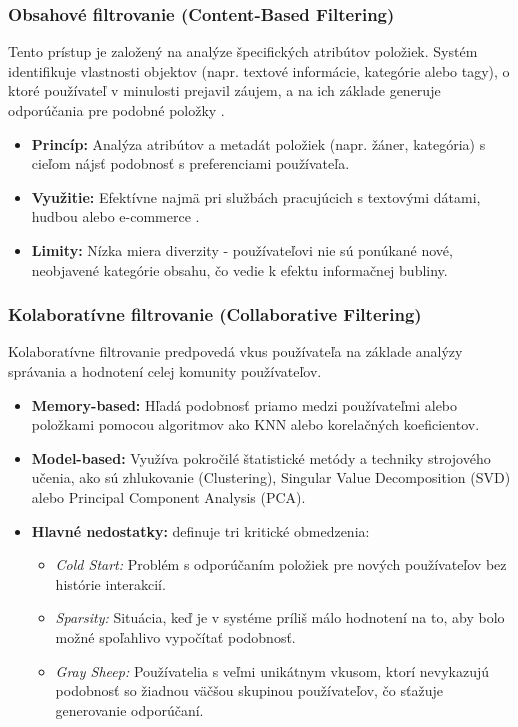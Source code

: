 \subsubsection{Obsahové filtrovanie (Content-Based Filtering)}
Tento prístup je založený na analýze špecifických atribútov položiek. Systém identifikuje vlastnosti objektov
(napr. textové informácie, kategórie alebo tagy), o ktoré používateľ v minulosti prejavil záujem, 
a na ich základe generuje odporúčania pre podobné položky \cite{ko2022survey}.
\begin{itemize}[noitemsep]
    \item \textbf{Princíp:} Analýza atribútov a metadát položiek (napr. žáner, kategória) s cieľom nájsť podobnosť s preferenciami používateľa.
    \item \textbf{Využitie:} Efektívne najmä pri službách pracujúcich s textovými dátami, hudbou alebo e-commerce .
    \item \textbf{Limity:} Nízka miera diverzity - používateľovi nie sú ponúkané nové, neobjavené kategórie obsahu, čo vedie k efektu informačnej bubliny.
\end{itemize}\cite{ko2022survey}

\subsubsection{Kolaboratívne filtrovanie (Collaborative Filtering)}
Kolaboratívne filtrovanie predpovedá vkus používateľa na základe analýzy správania a hodnotení 
celej komunity používateľov.

\begin{itemize}[noitemsep]
    \item \textbf{Memory-based:} Hľadá podobnosť priamo medzi používateľmi alebo položkami pomocou algoritmov ako KNN alebo korelačných koeficientov.
    \item \textbf{Model-based:} Využíva pokročilé štatistické metódy a techniky strojového učenia, ako sú zhlukovanie (Clustering), Singular Value Decomposition (SVD) alebo Principal Component Analysis (PCA).
    \item \textbf{Hlavné nedostatky:}  definuje tri kritické obmedzenia:
    \begin{itemize}[noitemsep]
        \item \textit{Cold Start:} Problém s odporúčaním položiek pre nových používateľov bez histórie interakcií.
        \item \textit{Sparsity:} Situácia, keď je v systéme príliš málo hodnotení na to, aby bolo možné spoľahlivo vypočítať podobnosť.
        \item \textit{Gray Sheep:} Používatelia s veľmi unikátnym vkusom, ktorí nevykazujú podobnosť so 
        žiadnou väčšou skupinou používateľov, čo sťažuje generovanie odporúčaní.
    \end{itemize}
\end{itemize}\cite{ko2022survey}

